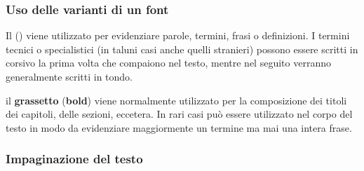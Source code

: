 						\subsubsection{Uso delle varianti di un font}
						
Il  () viene utilizzato per evidenziare parole, termini, frasi o definizioni. I termini tecnici o specialistici (in taluni casi anche quelli stranieri) possono essere scritti in corsivo la prima volta che compaiono nel testo, mentre nel seguito verranno generalmente scritti in tondo.

il \textbf{grassetto} (\textbf{bold}) viene normalmente utilizzato per la composizione dei titoli dei capitoli, delle sezioni, eccetera. In rari casi può essere utilizzato nel corpo del testo in modo da evidenziare maggiormente un termine ma mai una intera frase.



						\subsubsection{Impaginazione del testo}
						
